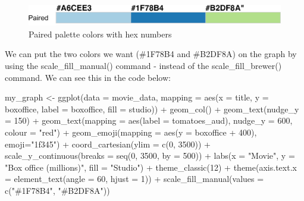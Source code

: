 \documentclass[
]{krantz}
\makeatletter
\newenvironment{Shaded}{\begin{snugshade}}{\end{snugshade}}
\newcommand{\AttributeTok}[1]{\textcolor[rgb]{0.61,0.61,0.61}{#1}}
\newcommand{\DecValTok}[1]{\textcolor[rgb]{0.06,0.06,0.06}{#1}}
\newcommand{\FunctionTok}[1]{\textcolor[rgb]{0,0,0}{#1}}
\newcommand{\NormalTok}[1]{#1}
\newcommand{\OtherTok}[1]{\textcolor[rgb]{0.37,0.37,0.37}{#1}}
\newcommand{\SpecialCharTok}[1]{\textcolor[rgb]{0,0,0}{#1}}
\newcommand{\StringTok}[1]{\textcolor[rgb]{0.5,0.5,0.5}{#1}}
\newenvironment{kframe}{%
\medskip{}
\setlength{\fboxsep}{.8em}
 \def\at@end@of@kframe{}%
 \ifinner\ifhmode%
  \def\at@end@of@kframe{\end{minipage}}%
  \begin{minipage}{\columnwidth}%
 \fi\fi%
 \def\FrameCommand##1{\hskip\@totalleftmargin \hskip-\fboxsep
 \colorbox{shadecolor}{##1}\hskip-\fboxsep
     \hskip-\linewidth \hskip-\@totalleftmargin \hskip\columnwidth}%
 \MakeFramed {\advance\hsize-\width
   \@totalleftmargin\z@ \linewidth\hsize
   \@setminipage}}%
 {\par\unskip\endMakeFramed%
 \at@end@of@kframe}
\renewenvironment{Shaded}{\begin{kframe}}{\end{kframe}}
\makeatother
\begin{document}
\begin{figure}
\includegraphics[width=0.75\linewidth]{ch_graphing/images/pairedpalette} \caption{Paired palette colors with hex numbers}\label{fig:pairedpal}
\end{figure}

We can put the two colors we want (\#1F78B4 and \#B2DF8A) on the graph by using the scale\_fill\_manual() command - instead of the scale\_fill\_brewer() command. We can see this in the code below:

\begin{Shaded}
\begin{Highlighting}[]
\NormalTok{my\_graph }\OtherTok{\textless{}{-}} \FunctionTok{ggplot}\NormalTok{(}\AttributeTok{data =}\NormalTok{ movie\_data,}
           \AttributeTok{mapping =} \FunctionTok{aes}\NormalTok{(}\AttributeTok{x =}\NormalTok{ title,}
                         \AttributeTok{y =}\NormalTok{ boxoffice,}
                         \AttributeTok{label =}\NormalTok{ boxoffice, }
                         \AttributeTok{fill =}\NormalTok{ studio)) }\SpecialCharTok{+}
  \FunctionTok{geom\_col}\NormalTok{() }\SpecialCharTok{+}
  \FunctionTok{geom\_text}\NormalTok{(}\AttributeTok{nudge\_y =} \DecValTok{150}\NormalTok{)  }\SpecialCharTok{+}
  \FunctionTok{geom\_text}\NormalTok{(}\AttributeTok{mapping =} \FunctionTok{aes}\NormalTok{(}\AttributeTok{label =}\NormalTok{ tomatoes\_aud), }
            \AttributeTok{nudge\_y =} \DecValTok{600}\NormalTok{, }
            \AttributeTok{colour =} \StringTok{"red"}\NormalTok{) }\SpecialCharTok{+}
  \FunctionTok{geom\_emoji}\NormalTok{(}\AttributeTok{mapping =} \FunctionTok{aes}\NormalTok{(}\AttributeTok{y =}\NormalTok{ boxoffice }\SpecialCharTok{+} \DecValTok{400}\NormalTok{),}
             \AttributeTok{emoji=}\StringTok{"1f345"}\NormalTok{) }\SpecialCharTok{+}
  \FunctionTok{coord\_cartesian}\NormalTok{(}\AttributeTok{ylim =} \FunctionTok{c}\NormalTok{(}\DecValTok{0}\NormalTok{, }\DecValTok{3500}\NormalTok{)) }\SpecialCharTok{+}
  \FunctionTok{scale\_y\_continuous}\NormalTok{(}\AttributeTok{breaks =} \FunctionTok{seq}\NormalTok{(}\DecValTok{0}\NormalTok{, }\DecValTok{3500}\NormalTok{, }\AttributeTok{by =} \DecValTok{500}\NormalTok{)) }\SpecialCharTok{+}
  \FunctionTok{labs}\NormalTok{(}\AttributeTok{x =} \StringTok{"Movie"}\NormalTok{,}
       \AttributeTok{y =} \StringTok{"Box office (millions)"}\NormalTok{,}
       \AttributeTok{fill =} \StringTok{"Studio"}\NormalTok{) }\SpecialCharTok{+}
  \FunctionTok{theme\_classic}\NormalTok{(}\DecValTok{12}\NormalTok{) }\SpecialCharTok{+}
  \FunctionTok{theme}\NormalTok{(}\AttributeTok{axis.text.x =} \FunctionTok{element\_text}\NormalTok{(}\AttributeTok{angle =} \DecValTok{60}\NormalTok{, }
                                   \AttributeTok{hjust =} \DecValTok{1}\NormalTok{)) }\SpecialCharTok{+}
  \FunctionTok{scale\_fill\_manual}\NormalTok{(}\AttributeTok{values =} \FunctionTok{c}\NormalTok{(}\StringTok{"\#1F78B4"}\NormalTok{, }\StringTok{"\#B2DF8A"}\NormalTok{))}
\end{Highlighting}
\end{Shaded}
\end{document}
